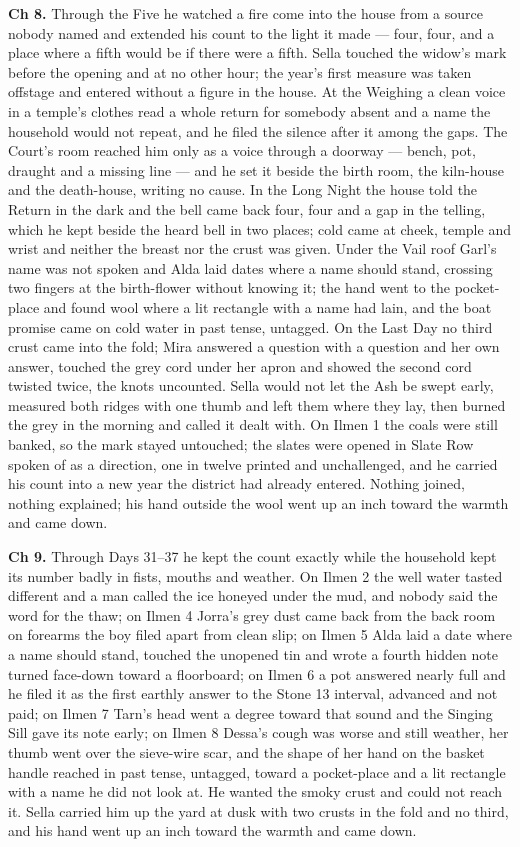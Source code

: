 \documentclass{design/chronicle}
\begin{document}
{\textbf{Ch 8.} Through the Five he watched a fire come into the house from a source nobody named and extended his count to the light it made --- four, four, and a place where a fifth would be if there were a fifth. Sella touched the widow’s mark before the opening and at no other hour; the year’s first measure was taken offstage and entered without a figure in the house. At the Weighing a clean voice in a temple’s clothes read a whole return for somebody absent and a name the household would not repeat, and he filed the silence after it among the gaps. The Court’s room reached him only as a voice through a doorway --- bench, pot, draught and a missing line --- and he set it beside the birth room, the kiln-house and the death-house, writing no cause. In the Long Night the house told the Return in the dark and the bell came back four, four and a gap in the telling, which he kept beside the heard bell in two places; cold came at cheek, temple and wrist and neither the breast nor the crust was given. Under the Vail roof Garl’s name was not spoken and Alda laid dates where a name should stand, crossing two fingers at the birth-flower without knowing it; the hand went to the pocket-place and found wool where a lit rectangle with a name had lain, and the boat promise came on cold water in past tense, untagged. On the Last Day no third crust came into the fold; Mira answered a question with a question and her own answer, touched the grey cord under her apron and showed the second cord twisted twice, the knots uncounted. Sella would not let the Ash be swept early, measured both ridges with one thumb and left them where they lay, then burned the grey in the morning and called it dealt with. On Ilmen 1 the coals were still banked, so the mark stayed untouched; the slates were opened in Slate Row spoken of as a direction, one in twelve printed and unchallenged, and he carried his count into a new year the district had already entered. Nothing joined, nothing explained; his hand outside the wool went up an inch toward the warmth and came down.

\textbf{Ch 9.} Through Days 31–37 he kept the count exactly while the household kept its number badly in fists, mouths and weather. On Ilmen 2 the well water tasted different and a man called the ice honeyed under the mud, and nobody said the word for the thaw; on Ilmen 4 Jorra’s grey dust came back from the back room on forearms the boy filed apart from clean slip; on Ilmen 5 Alda laid a date where a name should stand, touched the unopened tin and wrote a fourth hidden note turned face-down toward a floorboard; on Ilmen 6 a pot answered nearly full and he filed it as the first earthly answer to the Stone 13 interval, advanced and not paid; on Ilmen 7 Tarn’s head went a degree toward that sound and the Singing Sill gave its note early; on Ilmen 8 Dessa’s cough was worse and still weather, her thumb went over the sieve-wire scar, and the shape of her hand on the basket handle reached in past tense, untagged, toward a pocket-place and a lit rectangle with a name he did not look at. He wanted the smoky crust and could not reach it. Sella carried him up the yard at dusk with two crusts in the fold and no third, and his hand went up an inch toward the warmth and came down.

}
\end{document}
